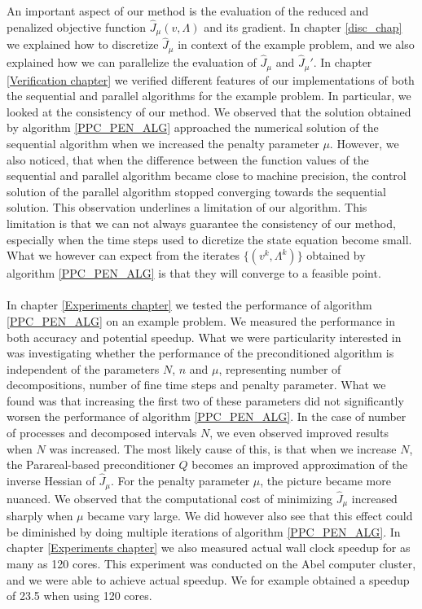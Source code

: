 An important aspect of our method is the evaluation of the reduced and penalized objective function $\hat J_{\mu}(v,\Lambda)$ and its gradient. In chapter \ref{disc_chap} we explained how to discretize $\hat J_{\mu}$ in context of the example problem, and we also explained how we can parallelize the evaluation of $\hat J_{\mu}$ and $\hat J_{\mu}'$. In chapter \ref{Verification chapter} we verified different features of our implementations of both the sequential and parallel algorithms for the example problem. In particular, we looked at the consistency of our method. We observed that the solution obtained by algorithm \ref{PPC_PEN_ALG} approached the numerical solution of the sequential algorithm when we increased the penalty parameter $\mu$. However, we also noticed, that when the difference between the function values of the sequential and parallel algorithm became close to machine precision, the control solution of the parallel algorithm stopped converging towards the sequential solution. This observation underlines a limitation of our algorithm. This limitation is that we can not always guarantee the consistency of our method, especially when the time steps used to dicretize the state equation become small. What we however can expect from the iterates $\{(v^k,\Lambda^k)\}$ obtained by algorithm \ref{PPC_PEN_ALG} is that they will converge to a feasible point.
\\
\\
In chapter \ref{Experiments chapter} we tested the performance of algorithm \ref{PPC_PEN_ALG} on an example problem. We measured the performance in both accuracy and potential speedup. What we were particularity interested in was investigating whether the performance of the preconditioned algorithm is independent of the parameters $N$, $n$ and $\mu$, representing number of decompositions, number of fine time steps and penalty parameter. What we found was that increasing the first two of these parameters did not significantly worsen the performance of algorithm \ref{PPC_PEN_ALG}. In the case of number of processes and decomposed intervals $N$, we even observed improved results when $N$ was increased. The most likely cause of this, is that when we increase $N$, the Parareal-based preconditioner $Q$ becomes an improved approximation of the inverse Hessian of $\hat J_{\mu}$. For the penalty parameter $\mu$, the picture became more nuanced. We observed that the computational cost of minimizing $\hat J_{\mu}$ increased sharply when $\mu$ became vary large. We did however also see that this effect could be diminished by doing multiple iterations of algorithm \ref{PPC_PEN_ALG}. In chapter \ref{Experiments chapter} we also measured actual wall clock speedup for as many as 120 cores. This experiment was conducted on the Abel computer cluster, and we were able to achieve actual speedup. We for example obtained a speedup of 23.5 when using 120 cores. 
